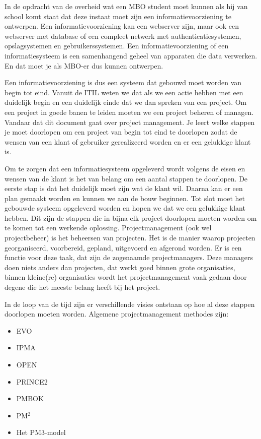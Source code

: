 In de opdracht van de overheid wat een MBO student moet kunnen als hij van school komt staat dat deze instaat moet zijn een informatievoorziening te ontwerpen. Een informatievoorziening kan een webserver zijn, maar ook een webserver met database of een compleet netwerk met authenticatiesystemen, opslagsystemen en gebruikerssystemen. Een informatievoorziening of een informatiesysteem is een samenhangend geheel van apparaten die data verwerken. En dat moet je als MBO-er dus kunnen ontwerpen.

Een informatievoorziening is dus een systeem dat gebouwd moet worden van begin tot eind. Vanuit de ITIL weten we dat als we een actie hebben met een duidelijk begin en een duidelijk einde dat we dan spreken van een project. Om een project in goede banen te leiden moeten we een project beheren of managen. Vandaar dat dit document gaat over project management. Je leert welke stappen je moet doorlopen om een project van begin tot eind te doorlopen zodat de wensen van een klant of gebruiker gerealizeerd worden en er een gelukkige klant is.

Om te zorgen dat een informatiesysteem opgeleverd wordt volgens de eisen en wensen van de klant is het van belang om een aantal stappen te doorlopen. De eerste stap is dat het duidelijk moet zijn wat de klant wil. Daarna kan er een plan gemaakt worden en kunnen we aan de bouw beginnen. Tot slot moet het gebouwde systeem opgeleverd worden en hopen we dat we een gelukkige klant hebben. Dit zijn de stappen die in bijna elk project doorlopen moeten worden om te komen tot een werkende oplossing. Projectmanagement (ook wel projectbeheer) is het beheersen van projecten. Het is de manier waarop projecten georganiseerd, voorbereid, gepland, uitgevoerd en afgerond worden. Er is een functie voor deze taak, dat zijn de zogenaamde projectmanagers. Deze managers doen niets anders dan projecten, dat werkt goed binnen grote organisaties, binnen kleine(re) organisaties wordt het projectmanagement vaak gedaan door degene die het meeste belang heeft bij het project.

In de loop van de tijd zijn er verschillende visies ontstaan op hoe al deze stappen doorlopen moeten worden. Algemene projectmanagement methodes zijn:
\begin{itemize}
\item EVO
\item IPMA
\item OPEN
\item PRINCE2
\item PMBOK
\item PM$^2$
\item Het PM3-model
\end{itemize}

